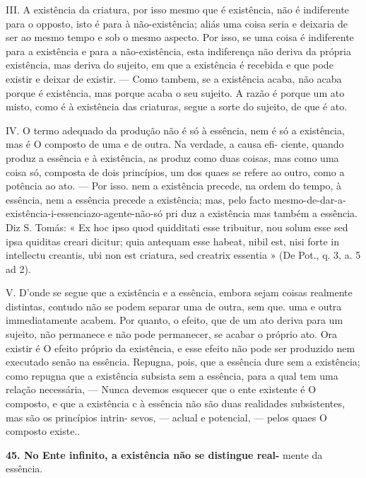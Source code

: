 \documentclass[12pt,a4paper]{article}
\newcommand{\pagmark}[1]{\quad[\textit{p.\,#1}]\quad}
\begin{document}
{{{{{{{{{{{{{{{{     \medskip\noindent III. A existência da criatura, por isso mesmo que é existência, não é
indiferente para o opposto, isto é para à não-existência; aliás uma coisa
seria e deixaria de ser ao mesmo tempo e sob o mesmo aspecto. Por isso,
se uma coisa é indiferente para a existência e para a não-existência, esta
indiferença não deriva da própria existência, mas deriva do sujeito, em que
a existência é recebida e que pode existir e deixar de existir. — Como tambem, se a existência acaba, não acaba porque é existência, mas porque
acaba o seu sujeito. A razão é porque um ato misto, como é à existência
das criaturas, segue a sorte do sujeito, de que é ato.

     \medskip\noindent IV. O termo adequado da produção não é só à essência, nem é só a
\pagmark{319}
existência, mas é O composto de uma e de outra. Na verdade, a causa efi-
 ciente, quando produz a essência e à existência, as produz como duas
 coisas, mas como uma coisa só, composta de dois princípios, um dos quaes
 se refere ao outro, como a potência ao ato. — Por isso. nem a existência
 precede, na ordem do tempo, à essência, nem a essência precede a existência;
 mas, pelo facto mesmo-de-dar-a-existência-i-essenciazo-agente-não-só pri
 duz a existência mas também a essência. Diz S. Tomás: « Ex hoc ipso quod
 quidditati esse tribuitur, nou solum esse sed ipsa quiditas creari dicitur;
 quia antequam esse habeat, nibil est, nisi forte in intellectu creantis, ubi
 non est criatura, sed creatrix essentia
 » (De Pot., q. 3, a. 5 ad 2).

     \medskip\noindent V. D'onde se segue que a existência e a essência, embora sejam coisas
 realmente distintas, contudo não se podem separar uma de outra, sem que.
 uma e outra immediatamente acabem. Por quanto, o efeito, que de um
 ato deriva para um sujeito, não permanece e não pode permanecer, se
 acabar o próprio ato. Ora existir é O efeito próprio da existência, e esse
 efeito não pode ser produzido nem executado senão na essência. Repugna,
 pois, que a essência dure sem a existência; como repugna que a existência
 subsista sem a essência, para a qual tem uma relação necessária, — Nunca
 devemos esquecer que o ente existente é O composto, e que a existência c à
 essência não são duas realidades subsistentes, mas são os princípios intrin-
 sevos, — aclual e potencial, — pelos quaes O composto existe.. 
\pagmark{318}

\medskip\noindent\textbf{45. No Ente infinito, a existência não se distingue real-}
mente da essência.


}}}}}}}}}}}}}}}}
\end{document}
